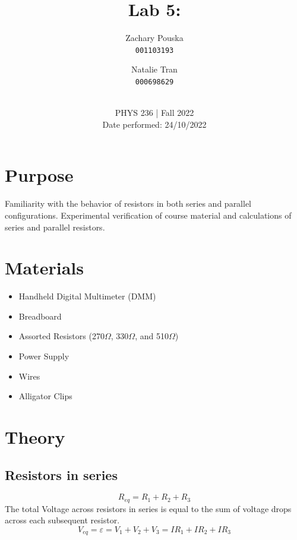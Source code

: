 \documentclass[titlepage]{article}
\begin{document}
\title{\textbf{Lab 5: }}
\author{
    Zachary Pouska\\
    \texttt{001103193}\\
    \and
    Natalie Tran \\ 
    \texttt{000698629}\\ \\
} 

\date{PHYS 236 | Fall 2022\\
Date performed: 24/10/2022}


	\maketitle



	\section{Purpose}
    Familiarity with the behavior of resistors in both series and parallel configurations. Experimental verification of course material and calculations of series and parallel resistors. 

    \section{Materials} 
    \begin{itemize}
        \item Handheld Digital Multimeter (DMM)
        \item Breadboard
        \item Assorted Resistors (270$\Omega$, 330$\Omega$, and 510$\Omega$)
        \item Power Supply
        \item Wires
        \item Alligator Clips
    \end{itemize}


	\section{Theory}	
    \subsection*{Resistors in series}
        $$R_{eq} = R_1 +R_2 + R_3 $$
        The total Voltage across resistors in series is equal to the sum of voltage drops across each subsequent resistor. $$ V_{eq} = \varepsilon = V_1 + V_2 + V_3 = I R_1 + I R_2 + I R_3 $$
\end{document}
